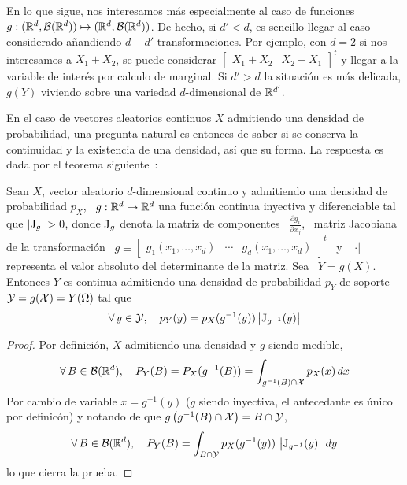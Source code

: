 En lo  que sigue, nos interesamos  m\'as especialmente al caso  de funciones $g:
(\mathbb{R}^d ,  \mathcal{B}(\mathbb{R}^d)) \mapsto (\mathbb{R}^d ,  \mathcal{B}(\mathbb{R}^d))$.  De hecho,  si $d' <
d$,   es    sencillo   llegar   al   caso    considerado   a\~nandiendo   $d-d'$
transformaciones. Por ejemplo, con $d = 2$  si nos interesamos a $X_1 + X_2$, se
puede considerar $\begin{bmatrix} X_1 + X_2 & X_2 - X_1\end{bmatrix}^t$ y llegar
a la variable de  inter\'es por calculo de marginal. Si $d'  > d$ la situaci\'on
es  m\'as  delicada,  $g(Y)$  viviendo  sobre una  variedad  $d$-dimensional  de
$\mathbb{R}^{d'}$.

En  el caso  de vectores  aleatorios continuos  $X$ admitiendo  una  densidad de
probabilidad,  una pregunta  natural  es entonces  de  saber si  se conserva  la
continuidad y la existencia de una densidad, as\'i que su forma. La respuesta es
dada por el teorema siguiente~\cite{Bre88, JacPro03, AthLah06, Coh13, HogMck13}:
%
\begin{teorema}
  Sean $X$, vector aleatorio  $d$-dimensional continuo y admitiendo una densidad
  de probabilidad  $p_X$, \ $g:\mathbb{R}^d  \mapsto \mathbb{R}^d$ una  funci\'on continua
  inyectiva y diferenciable tal que
 $\left| \operatorname{J}_g \right| > 0$,
 donde $\operatorname{J}_g$ denota la  matriz de componentes \ $\frac{\partial g_i}{\partial
   x_j}$, \ matriz Jacobiana de  la transformaci\'on \ $g \equiv \begin{bmatrix}
   g_1(x_1 , \ldots , x_d) & \cdots & g_d(x_1 , \ldots , x_d) \end{bmatrix}^t$ \
 y \ $|\cdot|$ representa el valor absoluto del determinante de la matriz. Sea \
 $Y = g(X)$.   Entonces $Y$ es continua admitiendo  una densidad de probabilidad
 $p_Y$ de soporte $\mathcal{Y} = g(\mathcal{X}) = Y(\Omega)$ tal que
  \[
  \forall \,  y \in  \mathcal{Y}, \quad p_Y(y)  = p_X(g^{-1}(y))  \left| \operatorname{J}_{g^{-1}}(y)
  \right|
  \]
\end{teorema}
%
\begin{proof}
Por definici\'on, $X$ admitiendo una densidad y $g$ siendo medible,
%
\[
\forall \, B  \in \mathcal{B}(\mathbb{R}^d), \quad P_Y(B) =  P_X(g^{-1}(B)) = \int_{g^{-1}(B) \cap \mathcal{X}}
p_X(x) \, dx
\]
%
Por cambio de variable $x =  g^{-1}(y)$ ($g$ siendo inyectiva, el antecedante es
\'unico por definic\'on) y notando de que $g\left( g^{-1}(B) \cap \mathcal{X} \right) = B
\cap \mathcal{Y}$,
%
\[
\forall \, B \in \mathcal{B}(\mathbb{R}^d), \quad  P_Y(B) = \int_{B \cap \mathcal{Y}} p_X(g^{-1}(y)) \,
\left| \operatorname{J}_{g^{-1}}(y) \right| \, dy
\]
%
lo que cierra la prueba.
\end{proof}

